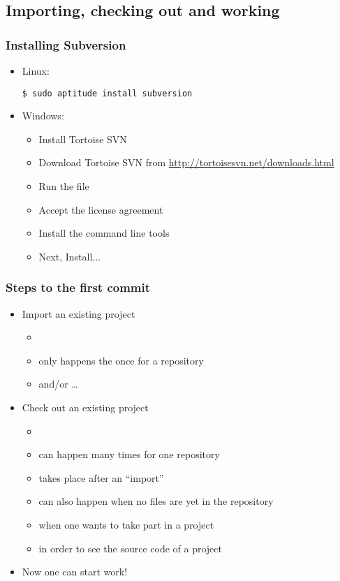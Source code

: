 \subsection{Importing, checking out and working}

\begin{frame}[fragile]
    \frametitle{Installing Subversion}
    \begin{itemize}
	\item Linux:
\begin{lstlisting}
$ sudo aptitude install subversion
\end{lstlisting}
	\item Windows:
	\begin{itemize}
	    \item Install Tortoise SVN
	    \item Download Tortoise SVN from
		\url{http://tortoisesvn.net/downloads.html}
	    \item Run the  file
	    \item Accept the license agreement
	    \item Install the command line tools
	    \item Next, Install...
	\end{itemize}
    \end{itemize}
\end{frame}

\begin{frame}[fragile]
\frametitle{Steps to the first commit}
\linuxframe
\begin{itemize}
\item Import an existing project
    \begin{itemize}
    \item {}
    \item only happens the once for a repository
    \item and/or \ldots
    \end{itemize}
\item Check out an existing project
    \begin{itemize}
    \item {}
    \item can happen many times for one repository
    \item takes place after an \enquote{import}
    \item can also happen when no files are yet in the repository
    \item when one wants to take part in a project
    \item in order to see the source code of a project
    \end{itemize}
\item Now one can start work! \ttalert{:-)}
\end{itemize}
\end{frame}

